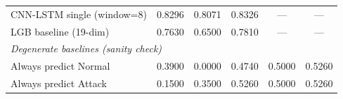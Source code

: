 \begin{table}[htbp]
\begin{tabular}{l c c c c c}
\quad CNN-LSTM single (window=8)                            & 0.8296 & 0.8071 & 0.8326 & ---     & ---     \\
\quad LGB baseline (19-dim)                                & 0.7630 & 0.6500 & 0.7810 & ---     & ---     \\
\hline
\multicolumn{6}{l}{\textit{Degenerate baselines (sanity check)}} \\
\quad Always predict Normal                              & 0.3900 & 0.0000 & 0.4740 & 0.5000 & 0.5260 \\
\quad Always predict Attack                              & 0.1500 & 0.3500 & 0.5260 & 0.5000 & 0.5260 \\
\hline\hline
\end{tabular}
\end{table}